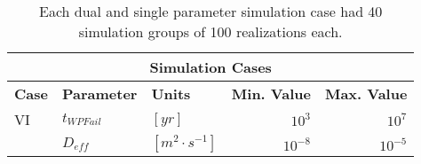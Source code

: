 \begin{table}[ht!]
\centering
\footnotesize{
\begin{tabular}{|l|l|l|r|r|}
\multicolumn{5}{c}{\textbf{Simulation Cases}}\\
\hline
\textbf{Case} & \textbf{Parameter} & \textbf{Units} & \textbf{Min. Value} & \textbf{Max. Value}\\
\hline 
VI    & $t_{WPFail}$        & $[yr]$         & $10^3$    &  $10^7$ \\
      & $D_{eff}$           & $[m^2\cdot s^{-1}]$       & $10^{-8}$    &  $10^{-5}$ \\
\hline
\end{tabular}
\caption{Each dual and single parameter simulation case had 40 simulation 
groups of 100 realizations each.}
\label{tab:Cases}
}
\end{table}

